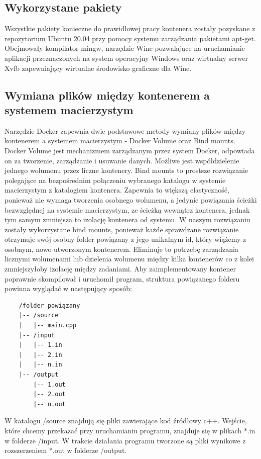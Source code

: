 \subsection{Wykorzystane pakiety}
Wszystkie pakiety konieczne do prawidłowej pracy kontenera zostały pozyskane z repozytorium Ubuntu 20.04 przy pomocy systemu zarządzania pakietami apt-get. Obejmowały kompilator mingw, narzędzie Wine pozwalające na uruchamianie aplikacji przeznaczonych na system operacyjny Windows oraz wirtualny serwer Xvfb zapewniający wirtualne środowisko graficzne dla Wine.

\subsection{Wymiana plików między kontenerem a systemem macierzystym}
Narzędzie Docker zapewnia dwie podstawowe metody wymiany plików między kontenerem a systemem macierzystym - Docker Volume\cite{dockerVolume} oraz Bind mounts\cite{dockerBindMounts}. Docker Volume jest mechanizmem zarządzanym przez system Docker, odpowiada on za tworzenie, zarządzanie i usuwanie danych. Możliwe jest współdzielenie jednego wolumenu przez liczne kontenery. Bind mounts to prostsze rozwiązanie polegające na bezpośrednim połączeniu wybranego katalogu w systemie macierzystym z katalogiem kontenera. Zapewnia to większą elastyczność, ponieważ nie wymaga tworzenia osobnego wolumenu, a jedynie powiązania ścieżki bezwzględnej na systemie macierzystym, ze ścieżką wewnątrz kontenera, jednak tym samym zmniejsza to izolację kontenera od systemu. W naszym rozwiązaniu zostały wykorzystane bind mounts, ponieważ każde sprawdzane rozwiązanie otrzymuje swój osobny folder powiązany z jego unikalnym id, który wiążemy z osobnym, nowo utworzonym kontenerem. Eliminuje to potrzebę zarządzania licznymi wolumenami lub dzielenia wolumenu między kilka kontenerów co z kolei zmniejszyłoby izolację między zadaniami. Aby zaimplementowany kontener poprawnie skompilował i uruchomił program, struktura powiązanego folderu powinna wyglądać w następujący sposób:
\begin{verbatim}
    /folder powiązany
    |-- /source
    |   |-- main.cpp
    |-- /input
    |   |-- 1.in
    |   |-- 2.in
    |   |-- n.in
    |-- /output
        |-- 1.out
        |-- 2.out
        |-- n.out
\end{verbatim}
W katalogu /source znajdują się pliki zawierające kod źródłowy c++. Wejście, które chcemy przekazać przy uruchamianiu programu, znajduje się w plikach *.in w folderze /input. W trakcie działania programu tworzone są pliki wynikowe z rozszerzeniem *.out w folderze /output. 

